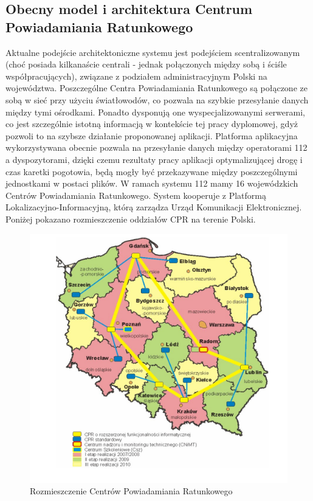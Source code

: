\documentclass[12pt]{article} %
\begin{document}
\subsection{Obecny model i architektura Centrum Powiadamiania Ratunkowego}
Aktualne podejście architektoniczne systemu jest podejściem scentralizowanym (choć posiada kilkanaście centrali - jednak połączonych między sobą i ściśle współpracujących), związane z podziałem administracyjnym Polski na województwa. Poszczególne Centra  Powiadamiania Ratunkowego są połączone ze sobą w sieć przy użyciu światłowodów, co pozwala na szybkie przesyłanie danych między tymi ośrodkami. Ponadto dysponują one
wyspecjalizowanymi serwerami, co jest szczególnie istotną informacją w kontekście tej pracy dyplomowej, gdyż pozwoli to na szybsze działanie proponowanej aplikacji. Platforma aplikacyjna wykorzystywana obecnie pozwala na przesyłanie danych między operatorami 112 a dyspozytorami, dzięki czemu rezultaty pracy aplikacji optymalizującej drogę i czas karetki pogotowia, będą mogły być przekazywane między poszczególnymi jednostkami w postaci plików.
W ramach systemu 112 mamy 16 wojewódzkich Centrów Powiadamiania Ratunkowego. System kooperuje z Platformą Lokalizacyjno-Informacyjną, którą zarządza Urząd Komunikacji Elektronicznej. Poniżej pokazano rozmieszczenie oddziałów CPR na terenie Polski.

\begin{figure}[H]
  \centering
  \includegraphics[width=\columnwidth]{images/mapa_cpr.png}
  \caption{Rozmieszczenie Centrów Powiadamiania Ratunkowego}
\end{figure}
\end{document}
